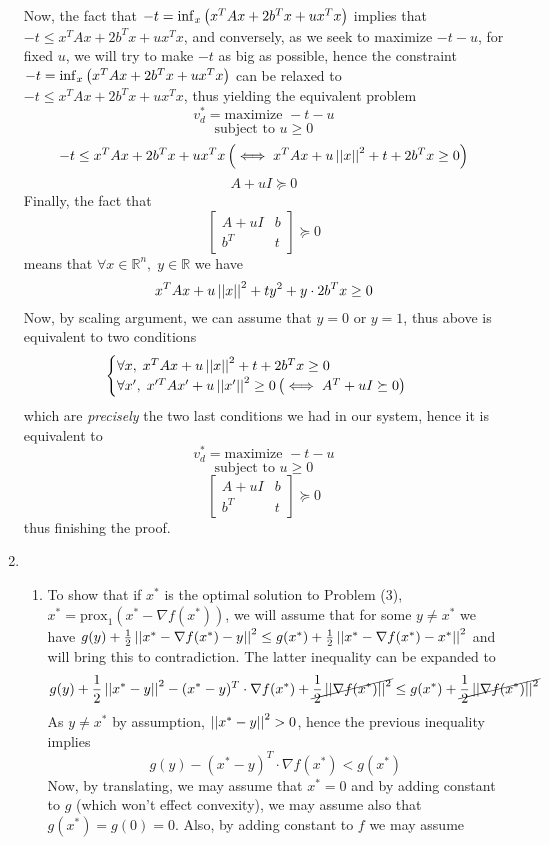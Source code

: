 \documentclass[8pt]{article} %
\begin{document}
\begin{enumerate}[label=\bfseries Problem \arabic*.]
		Now, the fact that $-t=\inf_{x}\left(x^TAx+2b^Tx+ux^Tx\right)$ implies that $-t\leq{x^TAx+2b^Tx+ux^Tx}$, and 
		conversely, as we seek to maximize $-t-u$, for fixed $u$, we will try to make $-t$ as big as possible, hence
		the constraint $-t=\inf_{x}\left(x^TAx+2b^Tx+ux^Tx\right)$ can be relaxed to $-t\leq{x^TAx+2b^Tx+ux^Tx}$, thus
		yielding the equivalent problem 
		\[v_d^*=\mbox{maximize }-t-u\]
		\[\mbox{subject to }u\geq0\]
		\[-t\leq{x^TAx+2b^Tx+ux^Tx}\left(\iff x^TAx+u\left|\left|x\right|\right|^2+t+2b^Tx\geq 0\right)\]
		\[A+uI\succeq0\]
		Finally, the fact that 
		\[\begin{bmatrix}A+uI&b\\b^T&t\end{bmatrix}\succeq0\]
		means that $\forall x\in\mathbb{R}^n,\;y\in\mathbb{R}$ we have
		\[x^TAx+u\left|\left|x\right|\right|^2+ty^2+y\cdot2b^Tx\geq0\]
		Now, by scaling argument, we can assume that $y=0$ or $y=1$, thus above is equivalent to two conditions
		\[\begin{cases}
			\forall x,\;x^TAx+u\left|\left|x\right|\right|^2+t+2b^Tx\geq0\\
			\forall x',\;x'^TAx'+u\left|\left|x'\right|\right|^2\geq0\left(\iff A^T+uI\succeq0\right)
		\end{cases}\]
		which are {\it precisely} the two last conditions we had in our system, hence it is equivalent to
		\[v_d^*=\mbox{maximize }-t-u\]
		\[\mbox{subject to }u\geq0\]
		\[\begin{bmatrix}A+uI&b\\b^T&t\end{bmatrix}\succeq0\]
		thus finishing the proof.
	\item\begin{enumerate}[label=(\alph*)]
				\newcommand{\prox}{\mbox{prox}}
			\item To show that if $x^*$ is the optimal solution to Problem (3), $x^*=\prox_1(x^*-\nabla f(x^*))$, we 
				will assume that for some $y\neq x^*$ we have $g(y)+\frac{1}{2}\left|\left|x^*-\nabla f(x^*)-y\right|\right|^2\leq
				g(x^*)+\frac{1}{2}\left|\left|x^*-\nabla f(x^*)-x^*\right|\right|^2$ and will bring this to contradiction. The
				latter inequality can be expanded to
				\[g(y)+\frac{1}{2}\left|\left|x^*-y\right|\right|^2-(x^*-y)^T\cdot\nabla f(x^*)+
				\cancel{\frac{1}{2}\left|\left|\nabla f(x^*)\right|\right|^2}\leq
				g(x^*)+\cancel{\frac{1}{2}\left|\left|\nabla f(x^*)\right|\right|^2}\]
				As $y\neq x^*$ by assumption, $\left|\left|x^*-y\right|\right|^2>0$, hence the previous inequality implies
				\[g(y)-(x^*-y)^T\cdot\nabla f(x^*)<g(x^*)\]
				Now, by translating, we may assume that $x^*=0$ and by adding constant to $g$ (which won't effect
				convexity), we may assume also that $g(x^*)=g(0)=0$. Also, by adding constant to $f$ we may assume

\end{enumerate}
\end{enumerate}
\end{document}
